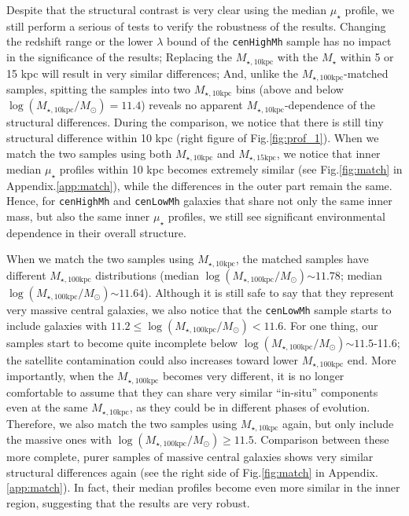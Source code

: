 \documentclass{emulateapj}
\def\rbcg{\texttt{cenHighMh}}
\def\nbcg{\texttt{cenLowMh}}
\def\mstar{{$M_{\star}$}}
\def\minn{{$M_{\star,10\mathrm{kpc}}$}}
\def\meff{{$M_{\star,15\mathrm{kpc}}$}}
\def\mtot{{$M_{\star,100\mathrm{kpc}}$}}
\def\logminn{{$\log (M_{\star,10\mathrm{kpc}}/M_{\odot})$}}
\def\logmtot{{$\log (M_{\star,100\mathrm{kpc}}/M_{\odot})$}}
\def\mden{{$\mu_{\star}$}}
\newcommand{\update}[1]{\textcolor{Bittersweet}{#1}}
\begin{document}
\begin{CJK*}{UTF8}{gbsn}
    \update{
    Despite that the structural contrast is very clear using the median \mden{} 
    profile, we still perform a serious of tests to verify the robustness of the 
    results. 
    Changing the redshift range or the lower $\lambda$ bound of the \rbcg{} sample 
    has no impact in the significance of the results; 
    Replacing the \minn{} with the \mstar{} within 5 or 15 kpc will result in 
    very similar differences; 
    And, unlike the \mtot{}-matched samples, spitting the samples into two \minn{} 
    bins (above and below \logminn{}$=11.4$) reveals no apparent \minn{}-dependence 
    of the structural differences.
    During the comparison, we notice that there is still tiny structural difference
    within 10 kpc (right figure of Fig.\ref{fig:prof_1}).
    When we match the two samples using both \minn{} and \meff{}, we notice that 
    inner median \mden{} profiles within 10 kpc becomes extremely similar 
    (see Fig.\ref{fig:match} in Appendix.\ref{app:match}), while the differences 
    in the outer part remain the same. 
    Hence, for \rbcg{} and \nbcg{} galaxies that share not only the same inner mass, 
    but also the same inner \mden{} profiles, we still see significant environmental 
    dependence in their overall structure.}
    
    \update{
    When we match the two samples using \minn{}, the matched samples have 
    different \mtot{} distributions (median \logmtot{}$\sim 11.78$; 
    median \logmtot{}$\sim 11.64$).  
    Although it is still safe to say that they represent very massive central 
    galaxies, we also notice that the \nbcg{} sample starts to include galaxies with 
    $11.2 \leq$\logmtot{}$< 11.6$. 
    For one thing, our samples start to become quite incomplete below 
    \logmtot{}$\sim 11.5$-11.6; the satellite contamination could also increases
    toward lower \mtot{} end.  
    More importantly, when the \mtot{} becomes very different, it is no longer 
    comfortable to assume that they can share very similar ``in-situ'' components 
    even at the same \minn{}, as they could be in different phases of evolution.
    Therefore, we also match the two samples using \minn{} again, but only include the 
    massive ones with \logmtot{}$\geq 11.5$.  
    Comparison between these more complete, purer samples of massive central galaxies 
    shows very similar structural differences again (see the right side of 
    Fig.\ref{fig:match} in Appendix.\ref{app:match}).
    In fact, their median profiles become even more similar in the inner region,
    suggesting that the results are very robust.}
    

\end{CJK*}
\end{document}
